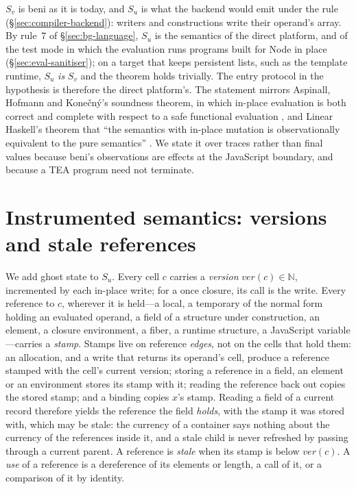 $S_v$ is beni as it is today, and $S_u$ is what the backend would emit under the rule
(\S\ref{sec:compiler-backend}): writers and constructions write their operand's array. By rule~7 of
\S\ref{sec:bg-language}, $S_u$ is the semantics of the direct platform, and of the test mode in which the
evaluation runs programs built for Node in place (\S\ref{sec:eval-sanitiser}); on a target that keeps
persistent lists, such as the template runtime, $S_u$ \emph{is} $S_v$ and the theorem holds trivially.
The entry protocol in the hypothesis is therefore the direct platform's. The statement
mirrors Aspinall, Hofmann and Kone\v{c}n\'y's soundness theorem, in which in-place evaluation is both
correct and complete with respect to a safe functional evaluation \citep[Thm.~5.8]{aspinall2008usage},
and Linear Haskell's theorem that ``the semantics with in-place mutation is observationally equivalent
to the pure semantics'' \citep[Thm.~3.9]{bernardy2018linear}. We state it over traces rather than final
values because beni's observations are effects at the JavaScript boundary, and because a TEA program
need not terminate.

\section{Instrumented semantics: versions and stale references}
\label{sec:soundness-instrumented}

We add ghost state to $S_u$. Every cell $c$ carries a \emph{version} $\mathit{ver}(c) \in \mathbb{N}$,
incremented by each in-place write; for a once closure, its call is the write. Every reference to $c$,
wherever it is held---a local, a temporary of the normal form holding an evaluated operand, a field of a
structure under construction, an element, a closure environment, a fiber, a runtime structure, a
JavaScript variable---carries a \emph{stamp}. Stamps live on reference \emph{edges}, not on the cells
that hold them: an allocation, and a write that returns its operand's cell, produce a reference stamped
with the cell's current version; storing a reference in a field, an element or an environment stores its
stamp with it; reading the reference back out copies the stored stamp; and a binding  copies
$x$'s stamp. Reading a field of a current record therefore yields the reference the field \emph{holds},
with the stamp it was stored with, which may be stale: the currency of a container says nothing about the
currency of the references inside it, and a stale child is never refreshed by passing through a current
parent. A reference is \emph{stale} when its stamp is below $\mathit{ver}(c)$. A \emph{use} of a
reference is a dereference of its elements or length, a call of it, or a comparison of it by identity.

